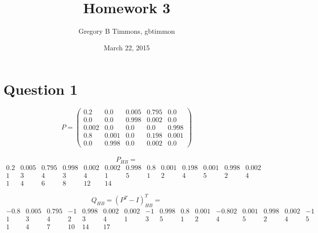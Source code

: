 \documentclass{article}
\begin{document}

\title{Homework 3}
\date{March 22, 2015}
\author{Gregory B Timmons, gbtimmon}
\maketitle
\section*{Question 1}
\[ P = 
\left(\begin{array}{ccccc}
0.2   & 0.0   & 0.005 & 0.795 & 0.0   \\
0.0   & 0.0   & 0.998 & 0.002 & 0.0   \\
0.002 & 0.0   & 0.0   & 0.0   & 0.998 \\
0.8   & 0.001 & 0.0   & 0.198 & 0.001 \\
0.0   & 0.998 & 0.0   & 0.002 & 0.0   
\end{array}\right)
\]
\\	
\[ P_{HB} = \]\[
\begin{array}{ccccccccccccc}
0.2 &0.005 &0.795 &0.998 &0.002 &0.002 &0.998 &0.8 &0.001 &0.198 &0.001 &0.998 &0.002 \\
1 &3 &4 &3 &4 &1 &5 &1 &2 &4 &5 &2 &4 \\
1 &4 &6 &8 &12 &14 
\end{array}
\]

\[ Q_{HB} = (P^{T} - I)^{T}_{HB} = \]\[
\begin{array}{cccccccccccccccc}
-0.8 &0.005 &0.795 &-1 &0.998 &0.002 &0.002 &-1 &0.998 &0.8 &0.001 &-0.802
&0.001 &0.998 &0.002 &-1 \\
1 &3 &4 &2 &3 &4 &1 &3 &5 &1 &2 &4 &5 &2 &4 &5 \\
1 &4 &7 &10 &14 &17 
\end{array}\]
\end{document}
